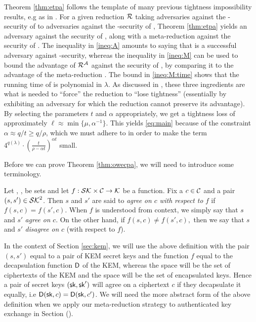 Theorem \ref{thm:etpa} follows the template of many previous tightness
impossibility results, e.g as in .
For a given reduction \(\redR\)
taking adversaries against the \ETPA-security of \TP to
adversaries against the \SICA-security of \Simple,
Theorem \ref{thm:etpa}
yields an adversary \advA against the \ETPA security of \TP,
along with a meta-reduction \redM against the \SICA security of \Simple.
The inequality in \eqref{ineq:A}
amounts to saying that \advA is a successful adversary against \ETPA-security,
whereas the inequality in \eqref{ineq:M} can be used to bound the advantage of \(\redR^{\advA}\)
against the \SICA security of \Simple,
by comparing it to the advantage of the meta-reduction \redM.
The bound in \eqref{ineq:M:time} shows that the running time of \redM is polynomial in \(\lambda\).
As discussed in , these three ingredients are what
is needed to ``force'' the reduction \redR to ``lose tightness''
(essentially by exhibiting an adversary for which the reduction cannot preserve its advantage).
By selecting the parameters  \(t\) and \(\alpha\) appropriately,
we get a tightness loss of approximately \(\ell \approx \min \{ \mu, \alpha^{-1}\}\).
This yields \eqref{eq:main} because of the constraint \(\alpha \approx q / t \ge q / \rho\),
which we must adhere to in order to make the term
\(4^{q(\lambda)} \cdot \left( \frac{t}{\rho - \alpha t} \right)^{\alpha t}\)
small.

Before we can prove Theorem \ref{thm:owecpa},
we will need to introduce some terminology.

\begin{definition}\label{def:agree}
  Let \setSK, \setC, \keyspace be sets and
  let \(f : \mathcal{SK} \times \mathcal{C} \to \mathcal{K}\) be a function.
  Fix a \(c \in \mathcal{C}\) and a pair \((s,s') \in \mathcal{SK}^{2}\).
  Then \(s\) and \(s'\) are said to \emph{agree on \(c\) with respect to \(f\)} if
  \(
    f(s,c) = f(s',c).
  \)
  When \(f\) is understood from context, we simply say that \(s\) and \(s'\) \emph{agree on \(c\)}.
  On the other hand, if
  \(
    f(s,c) \ne f(s',c),
  \)
  then we say that \(s\) and \(s'\) \emph{disagree on \(c\)} (with respect to \(f\)).
\end{definition}

In the context of Section \ref{sec:kem},
we will use the above definition with the pair \((s,s')\)
equal to a pair of KEM secret keys and the function \(f\)
equal to the decapsulation function \(\mathsf{D}\) of the KEM,
whereas the space \setC will be the set of ciphertexts of the KEM
and the space \keyspace will be the set of encapsulated keys.
Hence a pair of secret keys \((\mathsf{sk},\mathsf{sk}')\) will agree on a ciphertext \(c\)
if they decapsulate it equally, i.e \(\mathsf{D}(\mathsf{sk},c) = \mathsf{D}(\mathsf{sk},c')\).
We will need the more abstract form of the above definition
when we apply our meta-reduction strategy to authenticated key exchange in Section ().

